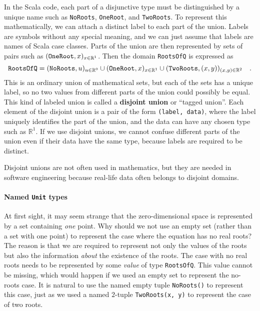 In the Scala code, each part of a disjunctive type must be distinguished
by a unique name such as \lstinline!NoRoots!, \lstinline!OneRoot!,
and \lstinline!TwoRoots!. To represent this mathematically, we can
attach a distinct label to each part of the union. Labels are symbols
without any special meaning, and we can just assume that labels are
names of Scala case classes. Parts of the union are then represented
by sets of pairs such as $(\text{\texttt{OneRoot}},x)_{x\in\mathbb{R}^{1}}$.
Then the domain \lstinline!RootsOfQ! is expressed as
\[
\text{\texttt{RootsOfQ}}=(\text{\texttt{NoRoots}},u)_{u\in\mathbb{R}^{0}}\cup(\text{\texttt{OneRoot}},x)_{x\in\mathbb{R}^{1}}\cup(\text{\texttt{TwoRoots}},\left(x,y\right))_{\left(x,y\right)\in\mathbb{R}^{2}}\quad.
\]
This is an ordinary union of mathematical sets, but each of the sets
has a unique label, so no two values from different parts of the union
could possibly be equal. This kind of labeled union is called a \textbf{disjoint
union} or \textsf{``}tagged union\textsf{''}. Each element of the disjoint union is
a pair of the form \lstinline!(label, data)!, where the label uniquely
identifies the part of the union, and the data can have any chosen
type such as $\mathbb{R}^{1}$. If we use disjoint unions, we cannot
confuse different parts of the union even if their data have the same
type, because labels are required to be distinct.

Disjoint unions are not often used in mathematics, but they are needed
in software engineering because real-life data often belongs to disjoint
domains.

\paragraph{Named \texttt{Unit} types}

At first sight, it may seem strange that the zero-dimensional space
is represented by a set containing \emph{one} point. Why should we
not use an empty set (rather than a set with one point) to represent
the case where the equation has no real roots? The reason is that
we are required to represent not only the values of the roots but
also the information \emph{about} the existence of the roots. The
case with no real roots needs to be represented by some \emph{value}
of type \lstinline!RootsOfQ!. This value cannot be missing, which
would happen if we used an empty set to represent the no-roots case.
It is natural to use the named empty tuple \lstinline!NoRoots()!
to represent this case, just as we used a named $2$-tuple \lstinline!TwoRoots(x, y)!
to represent the case of two roots.

